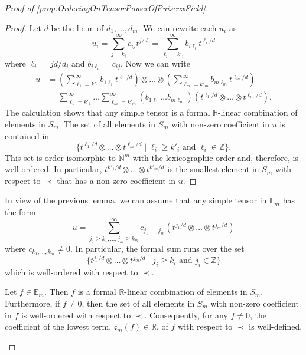 \documentclass[10pt,a4paper]{amsart}
\begin{document}
\begin{proof}[Proof of \cref{prop:OrderingOnTensorPowerOfPuiseuxField}]
    \begin{proof}
        Let $d$ be the l.c.m of $d_1,\dots,d_m$. We can rewrite each $u_i$ as 
        \[
        u_i = \sum\limits_{j=k_i}^{\infty} c_{ij}t^{j/d_i} = \sum\limits_{\ell_i=k'_i}^{\infty} b_{i\ell_i}t^{\ell_i/d}
        \]
        where $\ell_i = jd/d_i$ and $b_{i\ell_i} = c_{ij}$. Now we can write 
        \begin{align*}
            u 
            &= \left(\sum\limits_{\ell_1=k'_1}^{\infty} b_{1\ell_1}t^{\ell_1/d}\right) \otimes \dots \otimes \left(\sum\limits_{\ell_m=k'_m}^{\infty} b_{m\ell_m}t^{\ell_m/d}\right) \\
            &= \sum\limits_{\ell_1=k'_1}^{\infty}\dots\sum\limits_{\ell_m=k'_m}^{\infty}\left(b_{1\ell_1}\dots b_{m\ell_m}\right)\left(t^{\ell_1/d} \otimes \dots \otimes t^{\ell_m/d}\right).
        \end{align*}
         The calculation shows that any simple tensor is a formal $\mathbb{R}$-linear combination of elements in $S_m$. The set of all elements in $S_m$ with non-zero coefficient in $u$ is contained in 
        \[
        \{ t^{\ell_1/d} \otimes \dots \otimes t^{\ell_m/d} \mid \ell_i \geq k'_i \text{ and } \ell_i \in \mathbb{Z}\}.
        \]       
        This set is order-isomorphic to $\mathbb{N}^m$ with the lexicographic order and, therefore, is well-ordered. In particular, $t^{k'_1/d} \otimes \dots \otimes t^{k'_m/d}$ is the smallest element in $S_m$ with respect to $\prec$ that has a non-zero coefficient in $u$. 
    \end{proof}

    In view of the previous lemma, we can assume that any simple tensor in $\mathbb{E}_m$ has the form 
    \[
    u = \sum\limits_{j_1 \geq k_1,\dots,j_m \geq k_m}^\infty c_{j_1,\dots,j_m} (t^{j_1/d} \otimes \dots \otimes t^{j_m/d})
    \]
    where $c_{k_1,\dots,k_m} \neq 0$. In particular, the formal sum runs over the set 
    \[
        \{ t^{j_1/d} \otimes \dots \otimes t^{j_m/d} \mid j_i \geq k_i \text{ and } j_i \in \mathbb{Z}\}
    \]
    which is well-ordered with respect to $\prec$. 
    \begin{lem}
    \label{lem:WellDefinedLowestTerm}
        Let $f \in \mathbb{E}_m$. Then $f$ is a formal $\mathbb{R}$-linear combination of elements in $S_m$. Furthermore, if $f\neq 0$, then the set of all elements in $S_m$ with non-zero coefficient in $f$ is well-ordered with respect to $\prec$. Consequently, for any $f \neq 0$, the coefficient of the lowest term, $\mathfrak{c}_m(f) \in \mathbb{R}$, of $f$ with respect to $\prec$ is well-defined. 
    \end{lem}


\end{proof}
\end{document}
